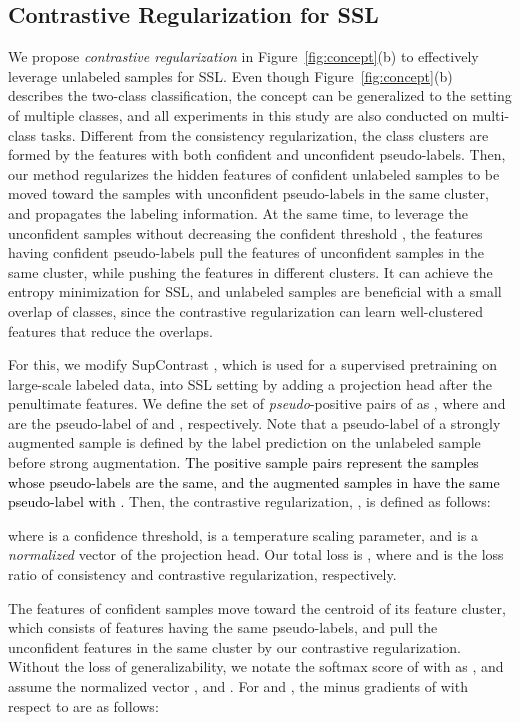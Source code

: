\documentclass[letterpaper]{article} \usepackage{aaai22}  \usepackage{times}  \usepackage{helvet}  \usepackage{courier}  \usepackage[hyphens]{url}  \usepackage{graphicx} \urlstyle{rm} \def\UrlFont{\rm}  \usepackage{natbib}  \usepackage{caption} \DeclareCaptionStyle{ruled}{labelfont=normalfont,labelsep=colon,strut=off} \frenchspacing  \setlength{\pdfpagewidth}{8.5in}  \setlength{\pdfpageheight}{11in}  \usepackage{algorithm}
\begin{document}
\subsection{Contrastive Regularization for SSL} \label{sec:grad_cr}
We propose \textit{contrastive regularization} in Figure~\ref{fig:concept}(b) to effectively leverage unlabeled samples for SSL.
Even though Figure~\ref{fig:concept}(b) describes the two-class classification, the concept can be generalized to the setting of multiple classes, and all experiments in this study are also conducted on multi-class tasks.
Different from the consistency regularization, the class clusters are formed by the features with both confident and unconfident pseudo-labels.
Then, our method regularizes the hidden features of confident unlabeled samples to be moved toward the samples with unconfident pseudo-labels in the same cluster, and propagates the labeling information.
At the same time, to leverage the unconfident samples without decreasing the confident threshold , the features having confident pseudo-labels pull the features of unconfident samples in the same cluster, while pushing the features in different clusters.
It can achieve the entropy minimization for SSL, and unlabeled samples are beneficial with a small overlap of classes, since the contrastive regularization can learn well-clustered features that reduce the overlaps.

For this, we modify SupContrast \cite{khosla2020supervised}, which is used for a supervised pretraining on large-scale labeled data, into SSL setting by adding a projection head after the penultimate features.
We define the set of \textit{pseudo}-positive pairs of  as , where  and  are the pseudo-label of  and , respectively.
Note that a pseudo-label of a strongly augmented sample  is defined by the label prediction on the unlabeled sample  before strong augmentation.
\textcolor{black}{The positive sample pairs represent the samples whose pseudo-labels are the same, and the augmented samples in  have the same pseudo-label with .}
Then, the contrastive regularization, , is defined as follows:


where  is a confidence threshold,  is a temperature scaling parameter, and  is a \textit{normalized} vector of the projection head.
Our total loss is 
, where  and  is the loss ratio of consistency and contrastive regularization, respectively.

The features of confident samples move toward the centroid of its feature cluster, which consists of features having the same pseudo-labels, and pull the unconfident features in the same cluster by our contrastive regularization.
Without the loss of generalizability, we notate the softmax score of  with  as , and assume the normalized vector , and .
For  and , the minus gradients of  with respect to  are as follows: 
\end{document}
